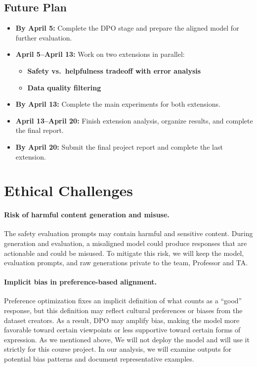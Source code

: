\documentclass[11pt]{article}
\begin{document}
\subsection{Future Plan}

\begin{itemize}
    \item \textbf{By April 5:} Complete the DPO stage and prepare the aligned model for further evaluation.
    
    \item \textbf{April 5--April 13:} Work on two extensions in parallel:
    \begin{itemize}
        \item \textbf{Safety vs.~helpfulness tradeoff with error analysis} 
        \item \textbf{Data quality filtering} 
    \end{itemize}
    
    \item \textbf{By April 13:} Complete the main experiments for both extensions.
    
    \item \textbf{April 13--April 20:} Finish extension analysis, organize results, and complete the final report.
    
    \item \textbf{By April 20:} Submit the final project report and complete the last extension.
\end{itemize}

\section{Ethical Challenges}
\paragraph{Risk of harmful content generation and misuse.}
The safety evaluation prompts may contain harmful and sensitive content. During generation and evaluation, a misaligned model could produce responses that are actionable and could be misused. To mitigate this risk, we will keep the model, evaluation prompts, and raw generations private to the team, Professor and TA. 

\paragraph{Implicit bias in preference-based alignment.}
Preference optimization fixes an implicit definition of what counts as a ``good'' response, but this definition may reflect cultural preferences or biases from the dataset creators. As a result, DPO may amplify bias, making the model more favorable toward certain viewpoints or less supportive toward certain forms of expression. As we mentioned above, We will not deploy the model and will use it strictly for this course project. In our analysis, we will examine outputs for potential bias patterns and document representative examples.
\end{document}
